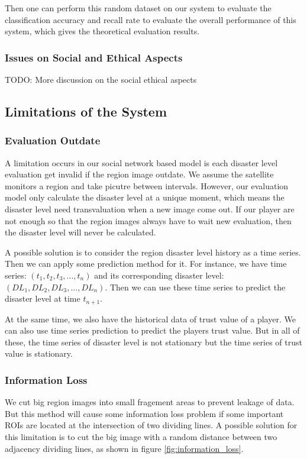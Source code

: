   Then one can perform this random dataset on our system to evaluate the classification accuracy and recall rate to
  evaluate the overall performance of this system, which gives the theoretical evaluation results.

  \subsubsection{Issues on Social and Ethical Aspects}

  TODO: More discussion on the social ethical aspects

\subsection{Limitations of the System}

  \subsubsection{Evaluation Outdate}

  A limitation occurs in our social network based model is each disaster level evaluation get invalid 
  if the region image outdate. 
  We assume the satellite monitors a region and take picutre between intervals. However, our evaluation
  model only calculate the disaster level at a unique moment, which means the disaster level need 
  transvaluation when a new image come out.
  If our player are not enough so that the region images always have to wait new evaluation, then the
  disaster level will never be calculated.

  A possible solution is to consider the region disaster level history as a time series. Then we can apply
  some prediction method for it. For instance, we have time series: $(t_1, t_2, t_3, ..., t_n)$
  and its corresponding disaster level: $(DL_1, DL_2, DL_3, ..., DL_n)$.
  Then we can use these time series to predict the disaster level at time $t_{n+1}$.

  At the same time, we also have the historical data of trust value of a player. We can also
  use time series prediction to predict the players trust value. But in all of these, the time series
  of disaster level is not stationary but the time series of trust value is stationary.

  \subsubsection{Information Loss}
  We cut big region images into small fragement areas to prevent leakage of data. 
  But this method will cause some information loss problem if some important ROIs are 
  located at the intersection of two dividing lines.
  A possible solution for this limitation is to cut the big image with a random distance 
  between two adjacency dividing lines, as shown in figure \ref{fig:information_loss}.

